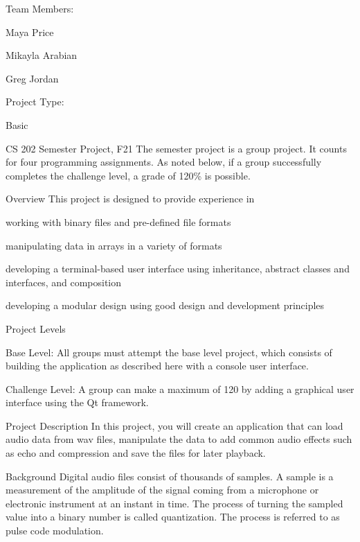 Team Members\+:
\begin{DoxyItemize}
\item Maya Price
\item Mikayla Arabian
\item Greg Jordan
\end{DoxyItemize}

Project Type\+:
\begin{DoxyItemize}
\item Basic
\end{DoxyItemize}

CS 202 Semester Project, F21 The semester project is a group project. It counts for four programming assignments. As noted below, if a group successfully completes the challenge level, a grade of 120\% is possible.

Overview This project is designed to provide experience in
\begin{DoxyItemize}
\item working with binary files and pre-\/defined file formats
\item manipulating data in arrays in a variety of formats
\item developing a terminal-\/based user interface using inheritance, abstract classes and interfaces, and composition
\item developing a modular design using good design and development principles
\end{DoxyItemize}

Project Levels
\begin{DoxyItemize}
\item Base Level\+: All groups must attempt the base level project, which consists of building the application as described here with a console user interface.
\item Challenge Level\+: A group can make a maximum of 120 by adding a graphical user interface using the Qt framework.
\end{DoxyItemize}

Project Description In this project, you will create an application that can load audio data from wav files, manipulate the data to add common audio effects such as echo and compression and save the files for later playback.

Background Digital audio files consist of thousands of samples. A sample is a measurement of the amplitude of the signal coming from a microphone or electronic instrument at an instant in time. The process of turning the sampled value into a binary number is called quantization. The process is referred to as pulse code modulation.


